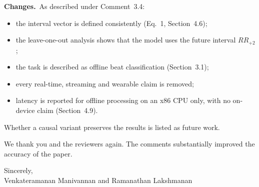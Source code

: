 \documentclass[11pt]{article}
\newcommand{\chg}{\textbf{Changes.}~}
\begin{document}
\chg As described under Comment~3.4:
\begin{itemize}[leftmargin=1.2em,itemsep=2pt]
\item the interval vector is defined consistently (Eq.~1, Section~4.6);
\item the leave-one-out analysis shows that the model uses the future interval $RR_{+2}$;
\item the task is described as offline beat classification (Section~3.1);
\item every real-time, streaming and wearable claim is removed;
\item latency is reported for offline processing on an x86 CPU only, with no on-device claim (Section~4.9).
\end{itemize}
Whether a causal variant preserves the results is listed as future work.

\bigskip
We thank you and the reviewers again. The comments substantially improved the accuracy of the paper.

Sincerely,\\
Venkateramanan Manivannan and Ramanathan Lakshmanan
\end{document}
